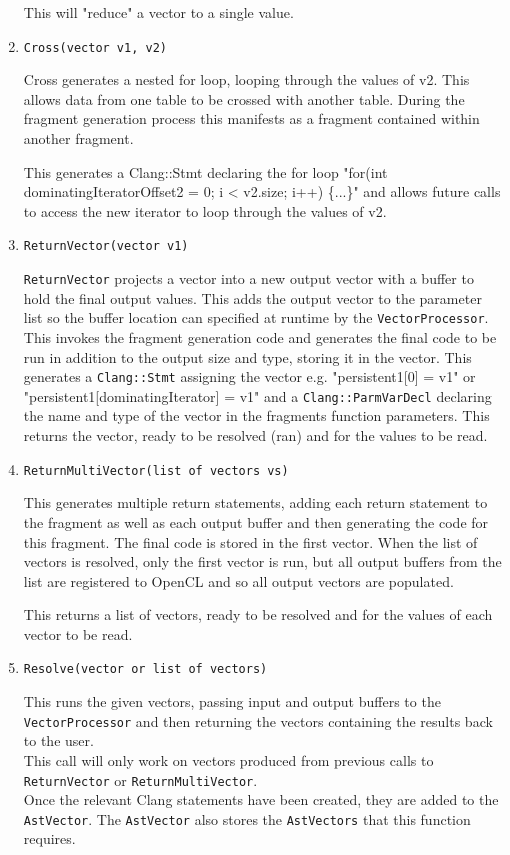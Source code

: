 \begin{enumerate}
This will "reduce" a vector to a single value. 

\item \texttt{Cross(vector v1, v2)}

Cross generates a nested for loop, looping through the values of v2. This allows data from one table to be crossed with another table. During the fragment generation process this manifests as a fragment contained within another fragment.

This generates a Clang::Stmt declaring the for loop "for(int dominatingIteratorOffset2 = 0; i < v2.size; i++) \{{...\}}" and allows future calls to access the new iterator to loop through the values of v2.

\item \texttt{ReturnVector(vector v1)}

\texttt{ReturnVector} projects a vector into a new output vector with a buffer to hold the final output values. This adds the output vector to the parameter list so the buffer location can specified at runtime by the \texttt{VectorProcessor}. This invokes the fragment generation code and generates the final code to be run in addition to the output size and type, storing it in the vector. This generates a \texttt{Clang::Stmt} assigning the vector e.g. "persistent1[0] = v1" or "persistent1[dominatingIterator] = v1" and a \texttt{Clang::ParmVarDecl} declaring the name and type of the vector in the fragments function parameters. This returns the vector, ready to be resolved (ran) and for the values to be read.

\item \texttt{ReturnMultiVector(list of vectors vs)}

This generates multiple return statements, adding each return statement to the fragment as well as each output buffer and then generating the code for this fragment. The final code is stored in the first vector. When the list of vectors is resolved, only the first vector is run, but all output buffers from the list are registered to OpenCL and so all output vectors are populated. 

This returns a list of vectors, ready to be resolved and for the values of each vector to be read.

\item \texttt{Resolve(vector or list of vectors)}

This runs the given vectors, passing input and output buffers to the \texttt{VectorProcessor} and then returning the vectors containing the results back to the user.\\
 This call will only work on vectors produced from previous calls to \texttt{ReturnVector} or \texttt{ReturnMultiVector}.\\
Once the relevant Clang statements have been created, they are added to the \texttt{AstVector}. The \texttt{AstVector} also stores the \texttt{AstVectors} that this function requires.

\end{enumerate}

